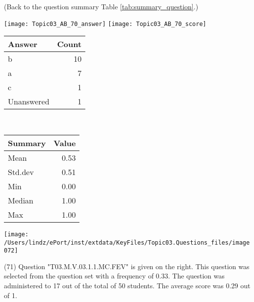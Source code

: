 \documentclass[12pt,english,nohyper]{tufte-handout}\usepackage[]{graphicx}\usepackage[]{color}
\begin{document}
 (Back to the question summary Table \ref{tab:summary_question}.)

\begin{center} \texttt{[image: Topic03\_AB\_70\_answer]} \texttt{[image: Topic03\_AB\_70\_score]} \end{center} 

\begin{center}%
\begin{tabular}{lr}
  \hline
Answer & Count \\ 
  \hline
b &  10 \\ 
  a &   7 \\ 
  c &   1 \\ 
  Unanswered &   1 \\ 
   \hline
\end{tabular}
~~~~~~~~%
\begin{tabular}{lr}
  \hline
Summary & Value \\ 
  \hline
Mean & 0.53 \\ 
  Std.dev & 0.51 \\ 
  Min & 0.00 \\ 
  Median & 1.00 \\ 
  Max & 1.00 \\ 
   \hline
\end{tabular}
\end{center}\newpage{}



\vspace{7cm}\begin{marginfigure}\texttt{[image: /Users/lindz/ePort/inst/extdata/KeyFiles/Topic03.Questions\_files/image072]}\end{marginfigure}\vspace{-7cm} (71) Question "T03.M.V.03.1.1.MC.FEV" is given on the right. This question was selected from the question set with a frequency of 0.33. The question was administered to 17 out of the total of 50 students. The average score was 0.29 out of 1.
\end{document}
